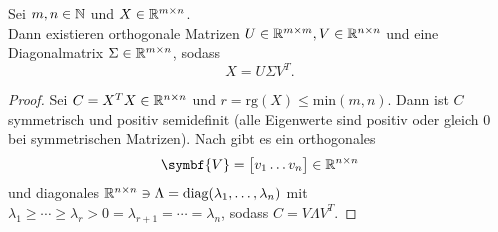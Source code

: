 \begin{theorem}[Singulärwertzerlegung]\label{th:svd}
    Sei \(m,n\in\mathbb{N}\) und \(X \in \mathbb{R}^{m \times n}\). \\
    Dann existieren orthogonale Matrizen \(U \in \mathbb{R}^{m \times m}, V \in \mathbb{R}^{n \times n}\) und eine Diagonalmatrix \(\Sigma \in \mathbb{R}^{m \times n}\), sodass
    \begin{equation*}
        X = U \Sigma V^{T}.
    \end{equation*}
\end{theorem}
\begin{proof}
    Sei \(C = X^{T}X \in \mathbb{R}^{n \times n}\) und \(r = \text{rg}(X) \leq \text{min}(m,n)\).
    Dann ist \(C\) symmetrisch und positiv semidefinit (alle Eigenwerte sind positiv oder gleich \num{0} bei symmetrischen Matrizen). 
    Nach  gibt es ein orthogonales 
    \begin{equation*}
        \symbf{V} =
        \big[
        \begin{matrix}
            v_1 \dots v_n
        \end{matrix}
        \big]
        \in \R^{n \times n}
    \end{equation*}
    und diagonales \(\mathbb{R}^{n \times n} \ni \Lambda = \text{diag}(\lambda_1,\ldots,\lambda_n)\) mit \(\lambda_1 \geq \cdots \geq \lambda_r > 0 = \lambda_{r+1} = \cdots = \lambda_n\), sodass \(C = V \Lambda V^{T}\).    


\end{proof}
